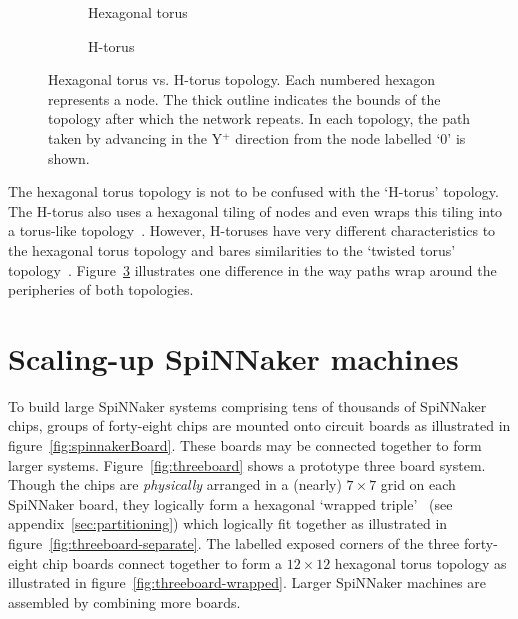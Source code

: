 		\begin{figure}
			\center
			\begin{subfigure}[b]{0.45\linewidth}
				\center
				\caption{Hexagonal torus}
				\label{fig:topo-compare-hexagonal-torus}
			\end{subfigure}
			\begin{subfigure}[b]{0.45\linewidth}
				\center
				\caption{H-torus}
				\label{fig:topo-compare-h-torus}
			\end{subfigure}
			
			\caption[Hexagonal torus vs. H-torus topology.]%
			{Hexagonal torus vs. H-torus topology. Each numbered hexagon
			represents a node. The thick outline indicates the bounds of the
			topology after which the network repeats. In each topology, the path
			taken by advancing in the Y$^+$ direction from the node labelled `0' is
			shown.}
			\label{fig:topo-compare}
		\end{figure}
		
		\label{sec:hex-vs-h-torus}
		
		The hexagonal torus topology is not to be confused with the `H-torus'
		topology. The H-torus also uses a hexagonal tiling of nodes and even wraps
		this tiling into a torus-like topology~\cite{zhao08}. However, H-toruses
		have very different characteristics to the hexagonal torus topology and
		bares similarities to the `twisted torus' topology~\cite{camara10}.
		Figure~\ref{fig:topo-compare} illustrates one difference in the way paths
		wrap around the peripheries of both topologies.
	
	\section{Scaling-up SpiNNaker machines}
		
		To build large SpiNNaker systems comprising tens of thousands of
		SpiNNaker chips, groups of forty-eight chips are mounted onto circuit
		boards as illustrated in figure~\ref{fig:spinnakerBoard}. These boards may
		be connected together to form larger systems.  Figure~\ref{fig:threeboard}
		shows a prototype three board system. Though the chips are
		\emph{physically} arranged in a (nearly) $7\times7$ grid on each SpiNNaker
		board, they logically form a hexagonal `wrapped
		triple'~\cite{davidsonWiring} (see appendix~\ref{sec:partitioning}) which
		logically fit together as illustrated in
		figure~\ref{fig:threeboard-separate}. The labelled exposed corners of the
		three forty-eight chip boards connect together to form a $12\times12$
		hexagonal torus topology as illustrated in
		figure~\ref{fig:threeboard-wrapped}. Larger SpiNNaker machines are
		assembled by combining more boards.
		
